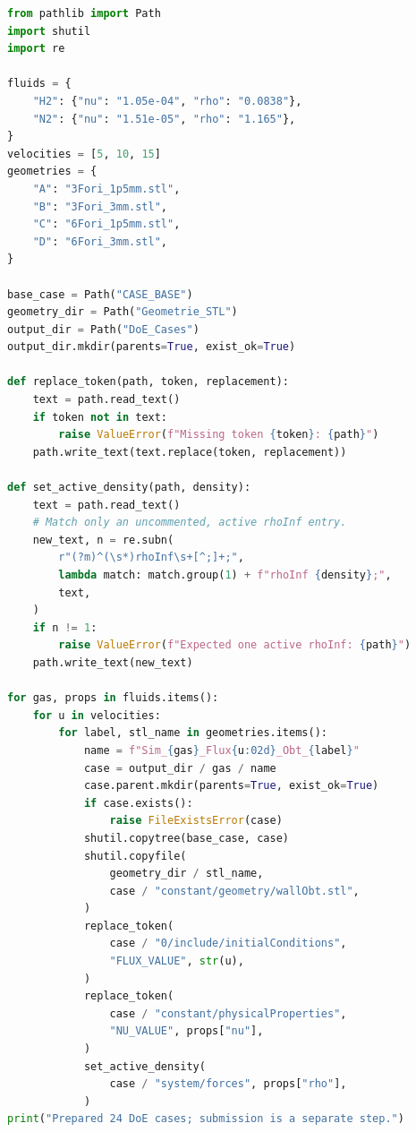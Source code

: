 \begin{lstlisting}[language=Python,caption={Illustrative Python generator for 24 cases with consistent gas properties.}, captionpos=b]
from pathlib import Path
import shutil
import re

fluids = {
    "H2": {"nu": "1.05e-04", "rho": "0.0838"},
    "N2": {"nu": "1.51e-05", "rho": "1.165"},
}
velocities = [5, 10, 15]
geometries = {
    "A": "3Fori_1p5mm.stl",
    "B": "3Fori_3mm.stl",
    "C": "6Fori_1p5mm.stl",
    "D": "6Fori_3mm.stl",
}

base_case = Path("CASE_BASE")
geometry_dir = Path("Geometrie_STL")
output_dir = Path("DoE_Cases")
output_dir.mkdir(parents=True, exist_ok=True)

def replace_token(path, token, replacement):
    text = path.read_text()
    if token not in text:
        raise ValueError(f"Missing token {token}: {path}")
    path.write_text(text.replace(token, replacement))

def set_active_density(path, density):
    text = path.read_text()
    # Match only an uncommented, active rhoInf entry.
    new_text, n = re.subn(
        r"(?m)^(\s*)rhoInf\s+[^;]+;",
        lambda match: match.group(1) + f"rhoInf {density};",
        text,
    )
    if n != 1:
        raise ValueError(f"Expected one active rhoInf: {path}")
    path.write_text(new_text)

for gas, props in fluids.items():
    for u in velocities:
        for label, stl_name in geometries.items():
            name = f"Sim_{gas}_Flux{u:02d}_Obt_{label}"
            case = output_dir / gas / name
            case.parent.mkdir(parents=True, exist_ok=True)
            if case.exists():
                raise FileExistsError(case)
            shutil.copytree(base_case, case)
            shutil.copyfile(
                geometry_dir / stl_name,
                case / "constant/geometry/wallObt.stl",
            )
            replace_token(
                case / "0/include/initialConditions",
                "FLUX_VALUE", str(u),
            )
            replace_token(
                case / "constant/physicalProperties",
                "NU_VALUE", props["nu"],
            )
            set_active_density(
                case / "system/forces", props["rho"],
            )
print("Prepared 24 DoE cases; submission is a separate step.")
\end{lstlisting}

